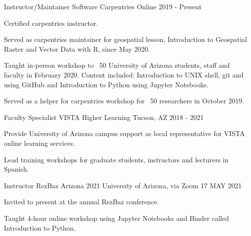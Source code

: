 


\begin{cventries}

\cventry
{Instructor/Maintainer} %
{Software Carpentries} %
{Online} %
{2019 - Present} %
{ %
\begin{cvitems}
\item {Certified carpentries instructor.}
\item {Served as carpentries maintainer for geospatial lesson, Introduction to Geospatial Raster and Vector Data with R, since May 2020.}
\item {Taught in-person workshop to ~50 University of Arizona students, staff and faculty in February 2020. Content included: Introduction to UNIX shell, git and using GitHub and Introduction to Python using Jupyter Notebooks.}
\item {Served as a helper for carpentries workshop for ~50 researchers in October 2019.}
\end{cvitems}
}


\cventry
{Faculty Specialist} %
{VISTA Higher Learning} %
{Tucson, AZ} %
{2018 - 2021} %
{ %
\begin{cvitems}
\item {Provide University of Arizona campus support as local representative for VISTA online learning services.}
\item {Lead training workshops for graduate students, instructors and lecturers in Spanish.}
\end{cvitems}
}

\cventry
{Instructor} %
{RezBaz Arizona 2021} %
{University of Arizona, via Zoom} %
{17 MAY 2021} %
{ %
\begin{cvitems}
\item {Invited to present at the annual RezBaz conference.}
\item {Taught 4-hour online workshop using Jupyter Notebooks and Binder called Introduction to Python.}
\end{cvitems}
}


\end{cventries}

